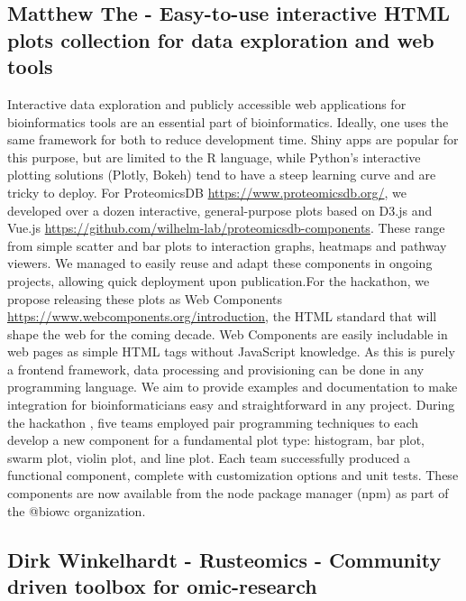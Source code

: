 \subsection{Matthew The - Easy-to-use interactive HTML plots collection for data exploration and web tools}

Interactive data exploration and publicly accessible web applications for bioinformatics tools are an essential part of bioinformatics. Ideally, one uses the same framework for both to reduce development time. Shiny apps are popular for this purpose, but are limited to the R language, while Python’s interactive plotting solutions (Plotly, Bokeh) tend to have a steep learning curve and are tricky to deploy. For ProteomicsDB \url{https://www.proteomicsdb.org/}, we developed over a dozen interactive, general-purpose plots based on D3.js and Vue.js \url{https://github.com/wilhelm-lab/proteomicsdb-components}. These range from simple scatter and bar plots to interaction graphs, heatmaps and pathway viewers. We managed to easily reuse and adapt these components in ongoing projects, allowing quick deployment upon publication.For the hackathon, we propose releasing these plots as Web Components \url{https://www.webcomponents.org/introduction}, the HTML standard that will shape the web for the coming decade. Web Components are easily includable in web pages as simple HTML tags without JavaScript knowledge. As this is purely a frontend framework, data processing and provisioning can be done in any programming language. We aim to provide examples and documentation to make integration for bioinformaticians easy and straightforward in any project.
During the hackathon \citep{issue11}, five teams employed pair programming techniques to each develop a new component for a fundamental plot type: histogram, bar plot, swarm plot, violin plot, and line plot. Each team successfully produced a functional component, complete with customization options and unit tests. These components are now available from the node package manager (npm) as part of the @biowc organization.

\subsection{Dirk Winkelhardt - Rusteomics - Community driven toolbox for omic-research}

